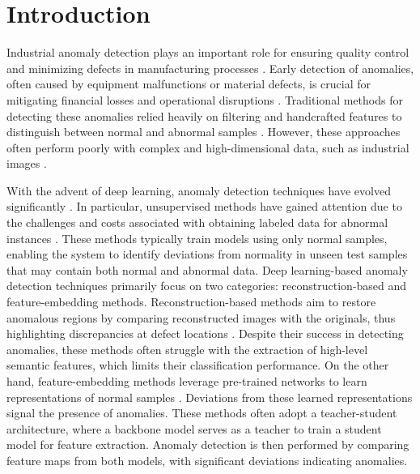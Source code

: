 \section*{Introduction}

Industrial anomaly detection plays an important role for ensuring quality control and minimizing defects in manufacturing processes \cite{chandola2009anomaly, iturbe2017towards, prunella2023deep}. Early detection of anomalies, often caused by equipment malfunctions or material defects, is crucial for mitigating financial losses and operational disruptions \cite{ren2024steel, zhang2024defect}. Traditional methods for detecting these anomalies relied heavily on filtering and handcrafted features to distinguish between normal and abnormal samples \cite{chandola2009anomaly}. However, these approaches often perform poorly with complex and high-dimensional data, such as industrial images \cite{yang2019real}.

With the advent of deep learning, anomaly detection techniques have evolved significantly \cite{tao2022deep, cui2023survey}. In particular, unsupervised methods have gained attention due to the challenges and costs associated with obtaining labeled data for abnormal instances \cite{cui2023survey}. These methods typically train models using only normal samples, enabling the system to identify deviations from normality in unseen test samples that may contain both normal and abnormal data. Deep learning-based anomaly detection techniques primarily focus on two categories: reconstruction-based and feature-embedding methods. Reconstruction-based methods aim to restore anomalous regions by comparing reconstructed images with the originals, thus highlighting discrepancies at defect locations \cite{akcay2019ganomaly, yu2023unsupervised, liu2020towards}. Despite their success in detecting anomalies, these methods often struggle with the extraction of high-level semantic features, which limits their classification performance. On the other hand, feature-embedding methods leverage pre-trained networks to learn representations of normal samples \cite{bergmann2020uninformed, salehi2021multiresolution, wang2021student, cao2022informative}. Deviations from these learned representations signal the presence of anomalies. These methods often adopt a teacher-student architecture, where a backbone model serves as a teacher to train a student model for feature extraction. Anomaly detection is then performed by comparing feature maps from both models, with significant deviations indicating anomalies.

